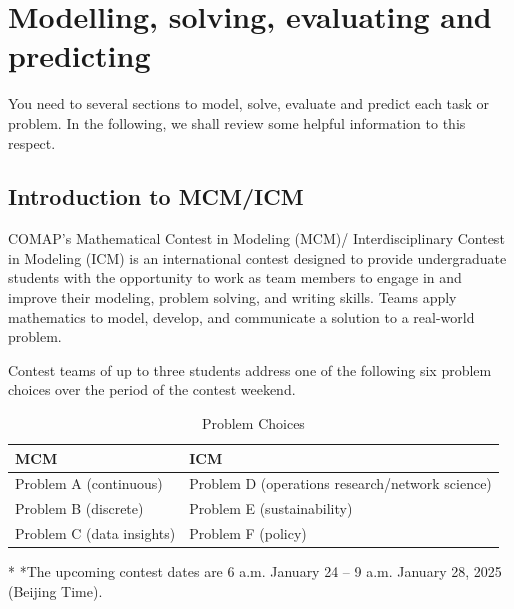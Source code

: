 \documentclass[12pt]{article}  %
\begin{document}
 \section{Modelling, solving, evaluating and predicting}
 
 You need to several sections to model, solve, evaluate and predict each task or problem. In the following, we shall review some helpful information to this respect.
 
 \subsection{Introduction to MCM/ICM}
 
 COMAP's Mathematical Contest in Modeling (MCM)/ Interdisciplinary Contest in Modeling (ICM) is an international contest designed to provide undergraduate students with the opportunity to work as team members to engage in and improve their modeling, problem solving, and writing skills. Teams apply mathematics to model, develop, and communicate a solution to a real-world problem.
 
 Contest teams of up to three students address one of the following six problem choices over the period of the contest weekend.
 
 \begin{table}[htbp]
     \begin{center}
         
         \caption{Problem Choices}
     \begin{tabular}{ll} %
     \toprule[2pt]
     \multicolumn{1}{m{5cm}}{\centering MCM}
     &\multicolumn{1}{m{9cm}}{\centering ICM}\\  %
             \midrule
             Problem A (continuous)   & Problem D (operations research/network science) \\
             Problem B (discrete)   & Problem E (sustainability) \\
              Problem C (data insights)   & Problem F (policy)\\
             \bottomrule[2pt]
         \end{tabular}	\label{tab2} %
         \begin{tablenotes}
             \footnotesize
             \item[*] *The upcoming contest dates are 6 a.m. January 24 -- 9 a.m. January 28, 2025 (Beijing Time). %
         \end{tablenotes}
     \end{center}
 \end{table} 
 \vspace{-.5cm}
 
\end{document}
